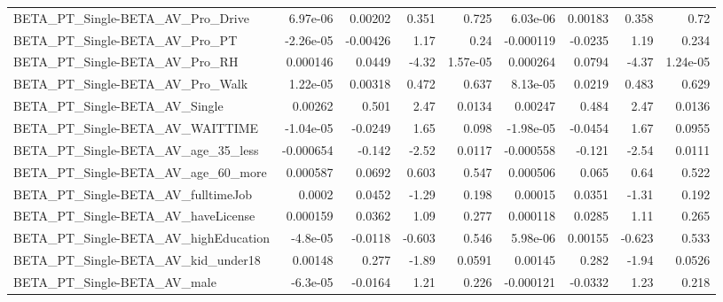 \begin{tabular}{lrrrrrrrr}
BETA\_PT\_Single-BETA\_AV\_Pro\_Drive                   &    6.97e-06 &      0.00202 &     0.351 &    0.725 &   6.03e-06 &     0.00183 &        0.358 &          0.72 \\
BETA\_PT\_Single-BETA\_AV\_Pro\_PT                      &   -2.26e-05 &     -0.00426 &      1.17 &     0.24 &  -0.000119 &     -0.0235 &         1.19 &         0.234 \\
BETA\_PT\_Single-BETA\_AV\_Pro\_RH                      &    0.000146 &       0.0449 &     -4.32 & 1.57e-05 &   0.000264 &      0.0794 &        -4.37 &      1.24e-05 \\
BETA\_PT\_Single-BETA\_AV\_Pro\_Walk                    &    1.22e-05 &      0.00318 &     0.472 &    0.637 &   8.13e-05 &      0.0219 &        0.483 &         0.629 \\
BETA\_PT\_Single-BETA\_AV\_Single                      &     0.00262 &        0.501 &      2.47 &   0.0134 &    0.00247 &       0.484 &         2.47 &        0.0136 \\
BETA\_PT\_Single-BETA\_AV\_WAITTIME                    &   -1.04e-05 &      -0.0249 &      1.65 &    0.098 &  -1.98e-05 &     -0.0454 &         1.67 &        0.0955 \\
BETA\_PT\_Single-BETA\_AV\_age\_35\_less                 &   -0.000654 &       -0.142 &     -2.52 &   0.0117 &  -0.000558 &      -0.121 &        -2.54 &        0.0111 \\
BETA\_PT\_Single-BETA\_AV\_age\_60\_more                 &    0.000587 &       0.0692 &     0.603 &    0.547 &   0.000506 &       0.065 &         0.64 &         0.522 \\
BETA\_PT\_Single-BETA\_AV\_fulltimeJob                 &      0.0002 &       0.0452 &     -1.29 &    0.198 &    0.00015 &      0.0351 &        -1.31 &         0.192 \\
BETA\_PT\_Single-BETA\_AV\_haveLicense                 &    0.000159 &       0.0362 &      1.09 &    0.277 &   0.000118 &      0.0285 &         1.11 &         0.265 \\
BETA\_PT\_Single-BETA\_AV\_highEducation               &    -4.8e-05 &      -0.0118 &    -0.603 &    0.546 &   5.98e-06 &     0.00155 &       -0.623 &         0.533 \\
BETA\_PT\_Single-BETA\_AV\_kid\_under18                 &     0.00148 &        0.277 &     -1.89 &   0.0591 &    0.00145 &       0.282 &        -1.94 &        0.0526 \\
BETA\_PT\_Single-BETA\_AV\_male                        &    -6.3e-05 &      -0.0164 &      1.21 &    0.226 &  -0.000121 &     -0.0332 &         1.23 &         0.218 \\

\end{tabular}
